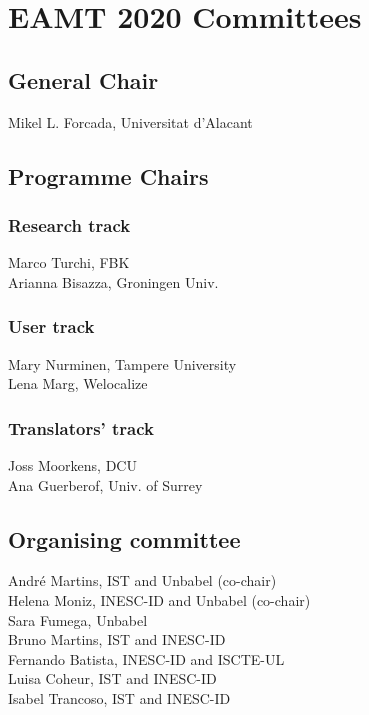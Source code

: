 \documentclass[a4paper,11pt,twoside]{book}
\begin{document}
\chapter*{EAMT 2020 Committees}

\section*{General Chair}
\noindent Mikel L. Forcada, Universitat d’Alacant


\section*{Programme Chairs}
\subsection*{Research track}
\noindent Marco Turchi, FBK\\
\noindent Arianna Bisazza, Groningen Univ.

\subsection*{User track}
\noindent Mary Nurminen, Tampere University\\
\noindent Lena Marg, Welocalize

\subsection*{Translators' track}
\noindent Joss Moorkens, DCU\\
\noindent Ana Guerberof, Univ. of Surrey

\section*{Organising committee}
\noindent André Martins, IST and Unbabel (co-chair)\\
\noindent Helena Moniz, INESC-ID and Unbabel (co-chair)\\
\noindent Sara Fumega, Unbabel\\
\noindent Bruno Martins, IST and INESC-ID\\
\noindent Fernando Batista, INESC-ID and ISCTE-UL\\
\noindent Luisa Coheur, IST and INESC-ID\\
\noindent Isabel Trancoso, IST and INESC-ID

\pagebreak
\end{document}
